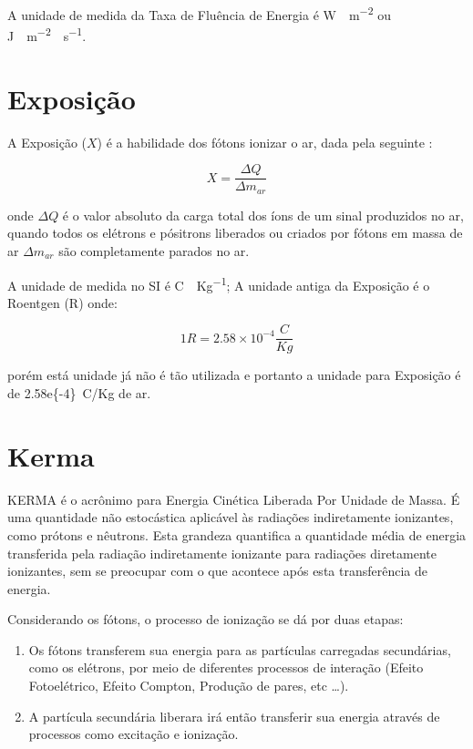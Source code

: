 \documentclass[11pt,a4paper]{article}
\newcounter{exemplo}
\begin{document}
		\begin{exemplo}[Unidade]
			A unidade de medida da Taxa de Fluência de Energia é \unit{W \cdot m^{-2}} ou \unit{J \cdot m^{-2} \cdot s^{-1}}.
		\end{exemplo}
		
		
	\section{Exposição}

		A Exposição ($X$) é a habilidade dos fótons ionizar o ar, dada pela seguinte  :

			\begin{equation}
				X = \frac{\Delta Q}{\Delta m_{ar}}
			\end{equation}

		\noindent onde $\Delta Q$ é o valor absoluto da carga total dos íons de um sinal produzidos no ar, quando todos os elétrons e pósitrons liberados ou criados por fótons em  massa de ar $\Delta m_{ar}$ são completamente parados no ar.
		
		
		\begin{exemplo}[Unidade]
			A unidade de medida no SI é \unit{C \cdot Kg^{-1}}; A unidade antiga da Exposição é o Roentgen (R) onde:

			\begin{equation*}
				1 R = 2.58 \times 10 ^{-4}\frac{C}{Kg}
			\end{equation*}

		\noindent porém está unidade já não é tão utilizada e portanto a unidade para Exposição é de \qty{2.58e{-4}}{C/Kg} de ar.
		\end{exemplo}
		

	\section{Kerma}

		KERMA é o acrônimo para Energia Cinética Liberada Por Unidade de Massa. É uma quantidade não estocástica aplicável às radiações indiretamente ionizantes, como prótons e nêutrons. Esta grandeza quantifica a quantidade média de energia transferida pela radiação indiretamente ionizante para radiações diretamente ionizantes, sem se preocupar com o que acontece após esta transferência de energia. 

		Considerando os fótons, o processo de ionização se dá por duas etapas: 

			\begin{enumerate}
				\item Os fótons transferem sua energia para as partículas carregadas secundárias, como os elétrons, por meio de diferentes processos de interação (Efeito Fotoelétrico, Efeito Compton, Produção de pares, etc \dots).
				
				\item A partícula secundária liberara irá então transferir sua energia através de processos como excitação e ionização. 
			\end{enumerate}
\end{document}

